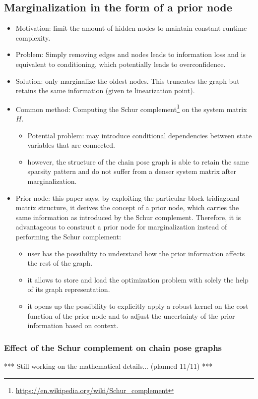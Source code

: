 \documentclass[letterpaper,11pt]{article}
\begin{document}
\subsection{Marginalization in the form of a prior node}

\begin{itemize}
	\item Motivation: limit the amount of hidden nodes to maintain constant runtime complexity.
	\item Problem: Simply removing edges and nodes leads to information loss and is equivalent to conditioning, which potentially leads to overconfidence.
	\item Solution: only marginalize the oldest nodes. This truncates the graph but retains the same information (given te linearization point).
	\item Common method: Computing the Schur complement\footnote{\url{https://en.wikipedia.org/wiki/Schur_complement}} on the system matrix $H$.
	\begin{itemize}
		\item Potential problem: may introduce conditional dependencies between state variables that are connected.
		\item however, the structure of the chain pose graph is able to retain the same sparsity pattern and do not suffer from a denser system matrix after marginalization.
	\end{itemize}
	\item Prior node: this paper says, by exploiting the particular block-tridiagonal matrix structure, it derives the concept of a prior node, which carries the same information as introduced by the Schur complement. Therefore, it is advantageous to construct a prior node for marginalization instead of performing the Schur complement:
	\begin{itemize}
		\item user has the possibility to understand how the prior information affects the rest of the graph.
		\item it allows to store and load the optimization problem with solely the help of its graph representation.
		\item it opens up the possibility to explicitly apply a robust kernel on the cost function of the prior node and to adjust the uncertainty of the prior information based on context.
	\end{itemize}
\end{itemize}

\subsubsection{Effect of the Schur complement on chain pose graphs}
***
Still working on the mathematical details... (planned 11/11)
***
\end{document}
